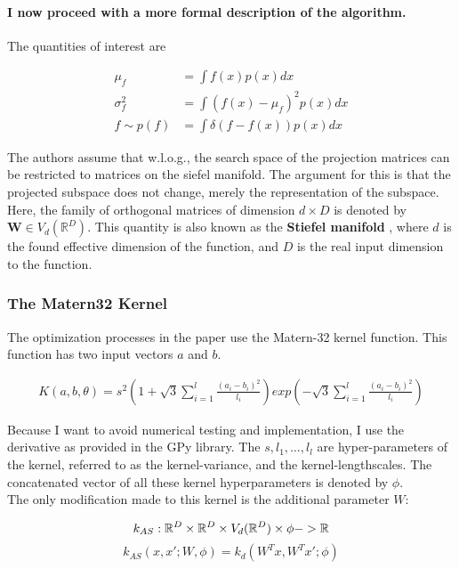 \paragraph{I now proceed with a more formal description of the algorithm.}
The quantities of interest are

\begin{align}
\mu_f &= \int f(x) p(x) dx \\
\sigma^2_f &= \int ( f(x) - \mu_f )^2 p(x) dx \\
f \sim p(f) &= \int \delta( f - f(x) ) p(x) dx
\end{align}

The authors assume that w.l.o.g., the search space of the projection matrices can be restricted to matrices on the siefel manifold.
The argument for this is that the projected subspace does not change, merely the representation of the subspace.
Here, the family of orthogonal matrices of dimension $d \times D$ is denoted by $\mathbf{W} \in V_d(\mathbb{R}^D) $.
This quantity is also known as the \textbf{Stiefel manifold} \citep{StiefelBayesianInference} \citep{StatisticsStiefelIntro} \citep{StiefelNonparametric}, where $d$ is the found effective dimension of the function, and $D$ is the real input dimension to the function. \\

\subsubsection{The Matern32 Kernel}
The optimization processes in the paper use the Matern-32 kernel function.
This function has two input vectors $a$ and $b$.

\begin{align}
K(a,  b, \theta) = s^2 \left( 1 + \sqrt{3} \sum_{i=1}^l \frac{(a_i - b_i)^2}{ \textit{l}_i} \right) exp\left( - \sqrt{3} \sum_{i=1}^l \frac{(a_i - b_i)^2}{ \textit{l}_i} \right)
\end{align}

Because I want to avoid numerical testing and implementation, I use the derivative as provided in the GPy library.
The $s, l_1, \ldots, l_l $ are hyper-parameters of the kernel, referred to as the kernel-variance, and the kernel-lengthscales. 
The concatenated vector of all these kernel hyperparameters is denoted by $\phi$. \\

The only modification made to this kernel is the additional parameter $W$:

\begin{equation}
k_{AS} : \mathbb{R}^D \times \mathbb{R}^D \times V_d(\mathbb{R}^D) \times \phi -> \mathbb{R} \\
\end{equation}
\begin{equation}
k_{AS} (x, x'; W, \phi) = k_d(W^T x, W^T x'; \phi)
\end{equation}

